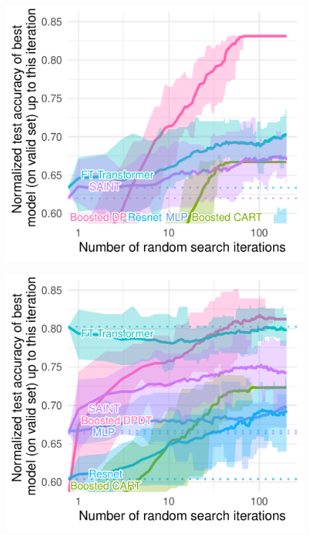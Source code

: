 \begin{figure}
\begin{minipage}{0.24\textwidth}
          \label{fig:boost-cat}
      \end{minipage}
    \centering
    \begin{minipage}{0.24\textwidth}
        \includegraphics[width=\textwidth]{images/figures/tab_bench/random_search_classif_numerical_boosting_all_notgb.pdf}
        \label{fig:classif-num-all}
    \end{minipage}
    \begin{minipage}{0.24\textwidth}
        \includegraphics[width=\textwidth]{images/figures/tab_bench/random_search_classif_categorical_boosting_all_notgb.pdf}

\end{minipage}
\end{figure}
